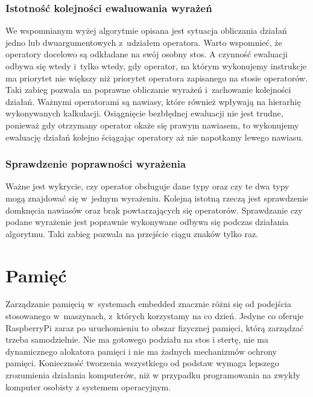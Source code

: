 \documentclass[shortabstract]{iithesis}
\begin{document}
\subsection{Istotność kolejności ewaluowania wyrażeń}
We wspomnianym wyżej algorytmie opisana jest sytuacja obliczania działań jedno lub dwuargumentowych z~udziałem operatora. Warto wspomnieć, że operatory docelowo są odkładane na swój osobny stos. A czynność ewaluacji odbywa się wtedy i~tylko wtedy, gdy operator, na którym wykonujemy instrukcje ma priorytet nie większy niż priorytet operatora zapisanego na stosie operatorów. Taki zabieg pozwala na poprawne obliczanie wyrażeń i~zachowanie kolejności działań. Ważnymi operatorami są nawiasy, które również wpływają na hierarhię wykonywanych kalkulacji. Osiągnięcie bezbłędnej ewaluacji nie jest trudne, ponieważ gdy otrzymany operator okaże się prawym nawiasem, to wykonujemy ewaluację działań kolejno ściągając operatory aż nie napotkamy lewego nawiasu.
\subsection{Sprawdzenie poprawności wyrażenia}
Ważne jest wykrycie, czy operator obsługuje dane typy oraz czy te dwa typy mogą znajdować się w~jednym wyrażeniu. Kolejną istotną rzeczą jest sprawdzenie domknęcia nawiasów oraz brak powtarzających się operatorów. Sprawdzanie czy podane wyrażenie jest poprawnie wykonywane odbywa się podczas działania algorytmu. Taki zabieg pozwala na przejście ciągu znaków tylko raz.


\chapter{Pamięć}
Zarządzanie pamięcią w~systemach embedded znacznie różni się od podejścia stosowanego w~maszynach, z~których korzystamy na co dzień. Jedyne co oferuje RaspberryPi zaraz po uruchomieniu to obszar fizycznej pamięci, którą zarządzać trzeba samodzielnie. Nie ma gotowego podziału na stos i stertę, nie ma dynamicznego alokatora pamięci i nie ma żadnych mechanizmów ochrony pamięci. Konieczność tworzenia wszystkiego od podstaw wymaga lepszego zrozumienia działania komputerów, niż w przypadku programowania na zwykły komputer osobisty z systemem operacyjnym.
\end{document}
